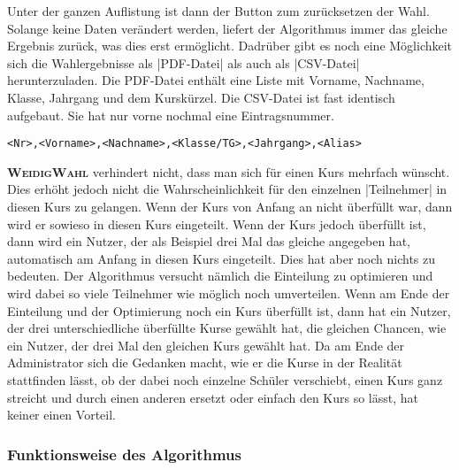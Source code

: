 \documentclass[ngerman]{ltxdoc}
\newcommand{\name}{\textbf{\textsc{WeidigWahl}}\xspace}
\begin{document}
Unter der ganzen Auflistung ist dann der Button zum zurücksetzen der Wahl. Solange
keine Daten verändert werden, liefert der Algorithmus immer das gleiche Ergebnis
zurück, was dies erst ermöglicht. Dadrüber gibt es noch eine Möglichkeit sich
die Wahlergebnisse als |PDF-Datei| als auch als |CSV-Datei| herunterzuladen. Die
PDF-Datei enthält eine Liste mit Vorname, Nachname, Klasse, Jahrgang und dem
Kurskürzel. Die CSV-Datei ist fast identisch aufgebaut. Sie hat nur vorne nochmal
eine Eintragsnummer.

\begin{lstlisting}[style=tex]
<Nr>,<Vorname>,<Nachname>,<Klasse/TG>,<Jahrgang>,<Alias>
\end{lstlisting}

\name verhindert nicht, dass man sich für einen Kurs mehrfach wünscht. Dies erhöht
jedoch nicht die Wahrscheinlichkeit für den einzelnen |Teilnehmer| in diesen Kurs
zu gelangen. Wenn der Kurs von Anfang an nicht überfüllt war, dann wird er sowieso
in diesen Kurs eingeteilt. Wenn der Kurs jedoch überfüllt ist, dann wird ein Nutzer,
der als Beispiel drei Mal das gleiche angegeben hat, automatisch am Anfang in diesen
Kurs eingeteilt. Dies hat aber noch nichts zu bedeuten. Der Algorithmus versucht
nämlich die Einteilung zu optimieren und wird dabei so viele Teilnehmer wie möglich
noch umverteilen. Wenn am Ende der Einteilung und der Optimierung noch ein Kurs
überfüllt ist, dann hat ein Nutzer, der drei unterschiedliche überfüllte Kurse
gewählt hat, die gleichen Chancen, wie ein Nutzer, der drei Mal den gleichen
Kurs gewählt hat. Da am Ende der Administrator sich die Gedanken macht, wie er
die Kurse in der Realität stattfinden lässt, ob der dabei noch einzelne Schüler
verschiebt, einen Kurs ganz streicht und durch einen anderen ersetzt oder einfach
den Kurs so lässt, hat keiner einen Vorteil.

\subsubsection{Funktionsweise des Algorithmus}
\end{document}
